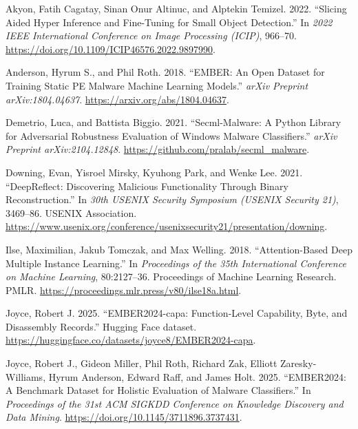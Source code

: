 \documentclass[
  10pt,
]{article}
\newlength{\cslhangindent}
\newenvironment{CSLReferences}[2] %
 {\begin{list}{}{%
  \setlength{\itemindent}{0pt}
  \setlength{\leftmargin}{0pt}
  \setlength{\parsep}{0pt}
  \ifodd #1
   \setlength{\leftmargin}{\cslhangindent}
   \setlength{\itemindent}{-1\cslhangindent}
  \fi
  \setlength{\itemsep}{#2\baselineskip}}}
 {\end{list}}
\begin{document}
\label{refs}
\begin{CSLReferences}{1}{0}
Akyon, Fatih Cagatay, Sinan Onur Altinuc, and Alptekin Temizel. 2022.
{``Slicing Aided Hyper Inference and Fine-Tuning for Small Object
Detection.''} In \emph{2022 IEEE International Conference on Image
Processing (ICIP)}, 966--70.
\url{https://doi.org/10.1109/ICIP46576.2022.9897990}.

Anderson, Hyrum S., and Phil Roth. 2018. {``{EMBER}: An Open Dataset for
Training Static PE Malware Machine Learning Models.''} \emph{arXiv
Preprint arXiv:1804.04637}. \url{https://arxiv.org/abs/1804.04637}.

Demetrio, Luca, and Battista Biggio. 2021. {``Secml-Malware: A Python
Library for Adversarial Robustness Evaluation of Windows Malware
Classifiers.''} \emph{arXiv Preprint arXiv:2104.12848}.
\url{https://github.com/pralab/secml_malware}.

Downing, Evan, Yisroel Mirsky, Kyuhong Park, and Wenke Lee. 2021.
{``{DeepReflect}: Discovering Malicious Functionality Through Binary
Reconstruction.''} In \emph{30th USENIX Security Symposium (USENIX
Security 21)}, 3469--86. USENIX Association.
\url{https://www.usenix.org/conference/usenixsecurity21/presentation/downing}.

Ilse, Maximilian, Jakub Tomczak, and Max Welling. 2018.
{``Attention-Based Deep Multiple Instance Learning.''} In
\emph{Proceedings of the 35th International Conference on Machine
Learning}, 80:2127--36. Proceedings of Machine Learning Research. PMLR.
\url{https://proceedings.mlr.press/v80/ilse18a.html}.

Joyce, Robert J. 2025. {``{EMBER2024-capa}:
Function-Level Capability, Byte, and Disassembly Records.''} Hugging
Face dataset.
\url{https://huggingface.co/datasets/joyce8/EMBER2024-capa}.

Joyce, Robert J., Gideon Miller, Phil Roth, Richard Zak, Elliott
Zaresky-Williams, Hyrum Anderson, Edward Raff, and James Holt. 2025.
{``{EMBER2024}: A Benchmark Dataset for Holistic Evaluation of Malware
Classifiers.''} In \emph{Proceedings of the 31st ACM SIGKDD Conference
on Knowledge Discovery and Data Mining}.
\url{https://doi.org/10.1145/3711896.3737431}.


\end{CSLReferences}
\end{document}
